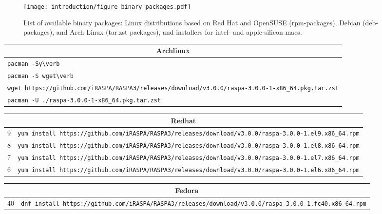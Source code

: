 \begin{figure}[p]
 \centering
  \texttt{[image: introduction/figure\_binary\_packages.pdf]}
  \caption{List of available binary packages: Linux distributions based on Red Hat and OpenSUSE (rpm-packages), Debian (deb-packages), and Arch Linux (tar.zst packages), and installers for intel- and apple-silicon macs.}
  \label{fig: binary_packages}
\end{figure}
\begin{table}[p]
  \scriptsize
  \begin{tabularx}{\linewidth}{X}
    \multicolumn{1}{c}{Archlinux}\\
    \hline
      \verb+pacman -Sy\verb+\\
      \verb+pacman -S wget\verb+\\
      \verb+wget https://github.com/iRASPA/RASPA3/releases/download/v3.0.0/raspa-3.0.0-1-x86_64.pkg.tar.zst+ \\
      \verb+pacman -U ./raspa-3.0.0-1-x86_64.pkg.tar.zst+\\
  \end{tabularx}
  \newline
\vspace*{0.5 cm}
\newline
  \begin{tabularx}{\linewidth}{c|X}
  \multicolumn{2}{c}{Redhat}\\
   \hline
  9 & \verb+yum install https://github.com/iRASPA/RASPA3/releases/download/v3.0.0/raspa-3.0.0-1.el9.x86_64.rpm+\\
     \hline
  8 & \verb+yum install https://github.com/iRASPA/RASPA3/releases/download/v3.0.0/raspa-3.0.0-1.el8.x86_64.rpm+\\
     \hline
  7 & \verb+yum install https://github.com/iRASPA/RASPA3/releases/download/v3.0.0/raspa-3.0.0-1.el7.x86_64.rpm+\\
     \hline
  6 & \verb+yum install https://github.com/iRASPA/RASPA3/releases/download/v3.0.0/raspa-3.0.0-1.el6.x86_64.rpm+\\
  \end{tabularx}
  \newline
\vspace*{0.5 cm}
\newline
  \begin{tabularx}{\linewidth}{c|X}
  \multicolumn{2}{c}{Fedora}\\
   \hline
  40 & \verb+dnf install https://github.com/iRASPA/RASPA3/releases/download/v3.0.0/raspa-3.0.0-1.fc40.x86_64.rpm+\\

\end{tabularx}
\end{table}
